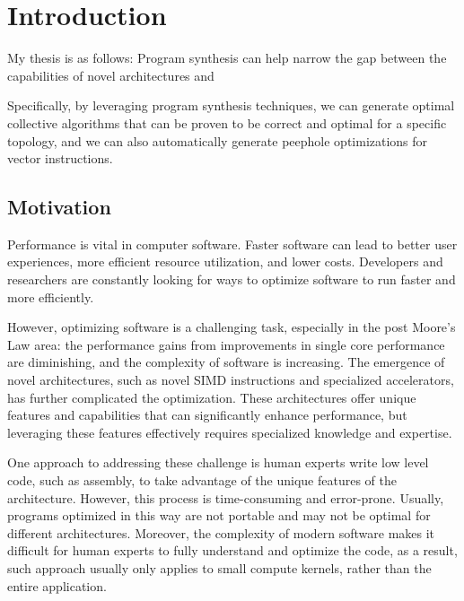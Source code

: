 \chapter{Introduction}
\label{chap:intro}


My thesis is as follows: Program synthesis can
help narrow the gap between the capabilities of novel architectures and



%
Specifically, by leveraging program synthesis
techniques, we can generate optimal collective algorithms that can be
proven to be correct and optimal for a specific topology, and we can
also automatically generate peephole optimizations for vector
instructions.


\section{Motivation}

Performance is vital in computer software.
%
Faster software can lead to better user experiences, more efficient
resource utilization, and lower costs. Developers and researchers are
constantly looking for ways to optimize software to run faster and
more efficiently.

However, optimizing software is a challenging task, especially in the
post Moore's Law area: the performance gains from improvements in
single core performance are diminishing, and the complexity of
software is increasing.
%
The emergence of novel architectures, such as novel SIMD instructions
and specialized accelerators, has further complicated the optimization.
These architectures offer unique features and capabilities that can
significantly enhance performance, but leveraging these features
effectively requires specialized knowledge and expertise.

One approach to addressing these challenge is human experts write low
level code, such as assembly, to take advantage of the unique features
of the architecture.
%
However, this process is time-consuming and
error-prone. Usually, programs optimized in this way are not
portable and may not be optimal for different architectures.
%
Moreover, the complexity of modern software makes it difficult for
human experts to fully understand and optimize the code, as a result,
such approach usually only applies to small compute kernels, rather than
the entire application.
%



